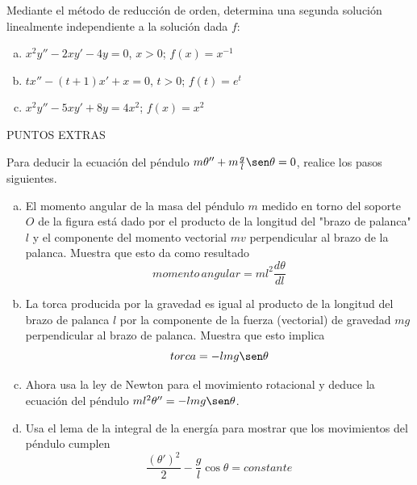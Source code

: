 \documentclass[12pt]{exam}
\begin{document}
\begin{questions}
     \question%
    Mediante el método de reducción de orden, determina una segunda solución linealmente independiente a la solución dada $f$:
    \begin{enumerate}[a)]
        \item $x^2y''-2xy'-4y=0$,  $x>0$;  $f(x)=x^{-1}$
        \item $tx''-(t+1)x'+x=0$,  $t>0$;  $f(t)=e^t$
        \item $x^2y''-5xy'+8y=4x^2$;  $f(x)=x^2$
    \end{enumerate}

     
     
        \end{questions}
        \vskip30pt
   PUNTOS EXTRAS 
	
    Para deducir la ecuación del péndulo $m\theta'' +m\frac{g}{l}\sen\theta=0$, realice los pasos siguientes.
    \begin{enumerate}[a)]
        \item El momento angular de la masa del péndulo $m$ medido en torno del soporte $O$ de la figura está dado por el producto de la longitud del 	"brazo de palanca"	$l$ y el componente
del momento vectorial $mv$ perpendicular al brazo de la palanca. Muestra que esto da como resultado $$momento\,angular=ml^2\frac{d\theta}{dl}$$
		\item La torca producida por la gravedad es igual al producto de la longitud del brazo de palanca $l$ por la componente de la fuerza (vectorial) de gravedad $mg$ perpendicular al brazo de palanca.
Muestra que esto implica $$torca=-lmg\sen\theta$$
		\item Ahora usa la ley de Newton para el movimiento rotacional y deduce la ecuación del péndulo $ml^2\theta''=-lmg\sen\theta$.
        
        \item Usa el lema de la integral de la energía para mostrar que los movimientos del péndulo cumplen $$\frac{(\theta')^2}{2}-\frac{g}{l}\cos\theta=constante$$

    \end{enumerate}
\end{document}
